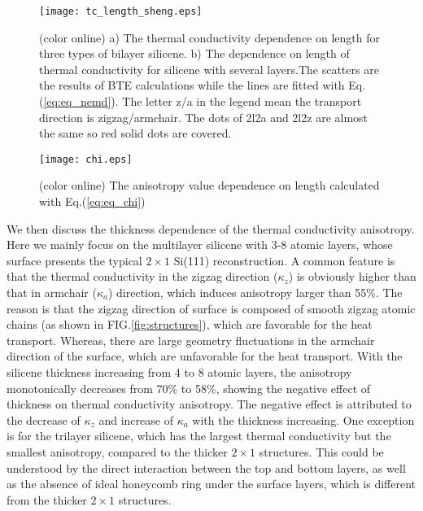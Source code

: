 \documentclass[aps,prb,twocolumn,showpacs,amsmath,amssymb]{revtex4-1}
\begin{document}
\begin{figure}[b]
  \texttt{[image: tc\_length\_sheng.eps]}
  \caption{\label{fig:tc_length_sheng} (color online) a) The thermal conductivity dependence on length for three types of bilayer silicene. b) The dependence on length of thermal conductivity for silicene with several layers.The scatters are the results of BTE calculations while the lines are fitted with Eq.(\ref{eq:eq_nemd}). The letter z/a in the legend mean the transport direction is zigzag/armchair. The dots of 2l2a and 2l2z are almost the same so red solid dots are covered. }
\end{figure}

\begin{figure}[b]
  \texttt{[image: chi.eps]}{}
  \caption{\label{fig:chi} (color online) The anisotropy value dependence on length calculated with Eq.(\ref{eq:eq_chi})}
\end{figure}


We then discuss the thickness dependence of the thermal conductivity anisotropy. Here we mainly focus on the multilayer silicene with 3-8 atomic layers, whose surface presents the typical $2 \times 1$ Si(111) reconstruction.   A common feature is that the thermal conductivity in the zigzag direction ($\kappa_z$) is obviously  higher than that  in armchair ($\kappa_a$) direction, which induces anisotropy larger than 55\%.
The reason is that the zigzag direction of surface is composed of smooth zigzag atomic chains (as shown in FIG.\ref{fig:structures}), which are favorable for the heat transport. Whereas,  there are large geometry fluctuations in the armchair direction of the surface, which are unfavorable for the heat transport.
With the silicene thickness increasing from 4 to 8 atomic layers, the anisotropy monotonically decreases from 70\% to 58\%, showing the negative  effect of thickness on  thermal conductivity anisotropy. The negative  effect  is attributed to the decrease of $\kappa_z$ and increase of $\kappa_a$  with the  thickness increasing.
One exception is for the trilayer silicene, which has the largest thermal conductivity  but the smallest  anisotropy, compared to the thicker  $2\times1$ structures.  This could be understood by the direct interaction between the top and bottom layers, as well as the absence of ideal honeycomb ring under the surface layers, which is different from the thicker $2\times 1$ structures\cite{Guo2015Structural}.
\end{document}
